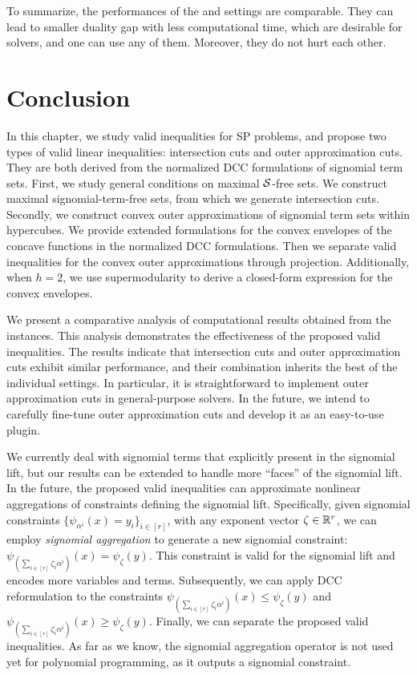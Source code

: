 To summarize, the performances of  the \oc and \ic settings are comparable. They can lead to smaller duality gap with less computational time, which are desirable for solvers, and one can use any of them. Moreover,  they do not hurt each other.



\section{Conclusion}

In this chapter, we study valid inequalities for SP problems, and propose two types of valid linear inequalities: intersection cuts and outer approximation cuts.  They are both derived from the normalized DCC formulations of signomial term sets. First, we study general conditions on maximal $\mathcal S$-free sets. We construct maximal signomial-term-free sets, from which we  generate   intersection cuts. Secondly, we construct  convex outer approximations of signomial term sets within hypercubes. We provide extended formulations for the convex envelopes of the concave functions in the normalized DCC formulations. Then we separate valid inequalities for the convex outer approximations through projection.  Additionally, when $h=2$, we use supermodularity to derive a closed-form expression for the convex envelopes.
 

We present a comparative analysis of computational results obtained from the \minlplib instances. This analysis demonstrates the effectiveness of the proposed valid inequalities. The results indicate that intersection cuts and outer approximation cuts exhibit similar performance, and their combination inherits the best of the individual settings. In particular, it is straightforward to  implement outer approximation cuts in general-purpose solvers.  In the future, we intend to carefully fine-tune outer approximation cuts  and develop it as an easy-to-use plugin. 

We currently deal with signomial terms that explicitly present in the signomial lift, but our results can be extended to handle more ``faces'' of the signomial lift. In the future, the proposed valid inequalities can  approximate nonlinear aggregations of  constraints defining the signomial lift. Specifically, given signomial constraints $\{\psi_{\alpha^i}(x) = y_i\}_{i \in [r]}$, with  any exponent vector $\zeta \in \mathbb R^r$, we can employ \emph{signomial aggregation} to generate a new signomial constraint: $\psi_{(\sum_{i \in [r]}\zeta_i\alpha^i)}(x) = \psi_{\zeta}(y)$. This constraint is valid for the signomial lift and encodes more variables and terms. Subsequently, we can apply DCC reformulation to the constraints  $\psi_{(\sum_{i \in [r]}\zeta_i\alpha^i)}(x) \le \psi_{\zeta}(y)$ and $\psi_{(\sum_{i \in [r]}\zeta_i\alpha^i)}(x) \ge \psi_{\zeta}(y)$. Finally, we can separate the proposed valid inequalities. As far as we know, the signomial aggregation operator is not used yet for polynomial programming, as it outputs a signomial constraint.




